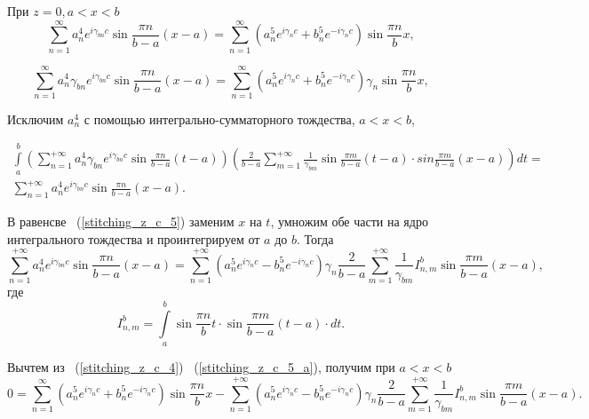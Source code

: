 При $z = 0, a < x < b$
\begin{equation}
	\label{stitching_z_c_4}
	\sum\limits_{n=1}^{\infty}a_n^4e^{i\gamma_{bn}c}\sin{\frac{\pi n}{b-a}(x-a)} = \sum\limits_{n=1}^{\infty}\left(a_n^5e^{i\gamma_{n}c}+b_n^5e^{-i\gamma_{n}c}\right)\sin{\frac{\pi n}{b}x},	
\end{equation}

\begin{equation}
	\label{stitching_z_c_5}
	\sum\limits_{n=1}^{\infty}a_n^4\gamma_{bn}e^{i\gamma_{bn}c}\sin{\frac{\pi n}{b-a}(x-a)} = \sum\limits_{n=1}^{\infty}\left(a_n^5e^{i\gamma_{n}c}+b_n^5e^{-i\gamma_{n}c}\right)\gamma_{n}\sin{\frac{\pi n}{b}x},	
\end{equation}

Исключим $a_n^4$ с помощью интегрально-сумматорного тождества, $a < x < b$,

\begin{multline*}
	\int\limits_a^b\left(\sum\limits_{n=1}^{+\infty}a_n^4\gamma_{bn}e^{i\gamma_{bn}c}\sin{\frac{\pi n}{b-a}(t-a)}\right)\left(\frac{2}{b-a}\sum\limits_{m=1}^{+\infty}\frac{1}{\gamma_{bm}}\sin{\frac{\pi m}{b-a}(t-a)} \cdot sin{\frac{\pi m}{b-a}(x-a)}\right)dt
	= \\
	\sum\limits_{n=1}^{+\infty}a_n^4e^{i\gamma_{bn}c}\sin{\frac{\pi n}{b-a}(x-a)}.
\end{multline*}

В равенсве ~(\ref{stitching_z_c_5}) заменим $x$ на $t$, умножим обе части на ядро интегрального тождества и проинтегрируем от $a$ до $b$. Тогда
\begin{equation}
	\label{stitching_z_c_5_a}
	\sum\limits_{n=1}^{+\infty}a_n^4e^{i\gamma_{bn}c}\sin{\frac{\pi n}{b-a}(x-a)} = \sum\limits_{n=1}^{+\infty}\left(a_n^5e^{i\gamma_{n}c}-b_n^5e^{-i\gamma_{n}c}\right)\gamma_{n}\frac{2}{b-a}\sum\limits_{m=1}^{+\infty}\frac{1}{\gamma_{bm}}I_{n,m}^b\sin{\frac{\pi m}{b-a}(x-a)},
\end{equation}
где
$$
	I_{n,m}^b = \int\limits_a^b\sin{\frac{\pi n}{b}t} \cdot \sin{\frac{\pi m}{b-a}(t-a)} \cdot dt.
$$

Вычтем из ~(\ref{stitching_z_c_4}) ~(\ref{stitching_z_c_5_a}), получим при $a < x < b$
\begin{equation}
	\label{stitching_z_c_6}
	0 = \sum\limits_{n=1}^{\infty}\left(a_n^5e^{i\gamma_{n}c}+b_n^5e^{-i\gamma_{n}c}\right)\sin{\frac{\pi n}{b}x} - \sum\limits_{n=1}^{+\infty}\left(a_n^5e^{i\gamma_{n}c}-b_n^5e^{-i\gamma_{n}c}\right)\gamma_{n}\frac{2}{b-a}\sum\limits_{m=1}^{+\infty}\frac{1}{\gamma_{bm}}I_{n,m}^b\sin{\frac{\pi m}{b-a}(x-a)}.
\end{equation}

